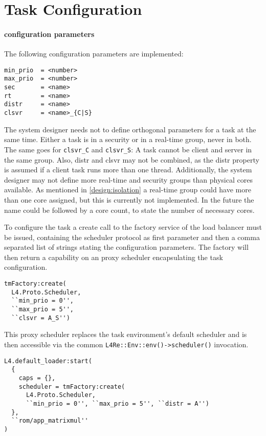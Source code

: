 \section{Task Configuration}
\label{impl:config}

\paragraph{configuration parameters}
The following configuration parameters are implemented:

\begin{lstlisting}[language={[5.2]Lua}]
min_prio  = <number>
max_prio  = <number>
sec       = <name>
rt        = <name>
distr     = <name>
clsvr     = <name>_{C|S}
\end{lstlisting}

The system designer needs not to define orthogonal parameters for
a task at the same time.
Either a task is in a security or in a real-time group, never in both.
The same goes for \texttt{clsvr\_C} and \texttt{clsvr\_S}:
A task cannot be client and server in the same group.
Also, distr and clsvr may not be combined, as the distr property is assumed
if a client task runs more than one thread.
Additionally, the system designer may not define more real-time and security
groups than physical cores available.
As mentioned in \ref{design:isolation} a real-time group could have more than
one core assigned, but this is currently not implemented.
In the future the name could be followed by a core count, to state the number
of necessary cores.

To configure the task a create call to the factory service of the load
balancer must be issued, containing the scheduler protocol as first parameter
and then a comma separated list of strings stating the configuration
parameters.
The factory will then return a capability on an proxy scheduler encapsulating
the task configuration.

\begin{lstlisting}[language={[5.2]Lua}]
tmFactory:create(
  L4.Proto.Scheduler,
  ``min_prio = 0'',
  ``max_prio = 5'',
  ``clsvr = A_S'')
\end{lstlisting}

This proxy scheduler replaces the task environment's default scheduler and is
then accessible via the common \texttt{L4Re::Env::env()->scheduler()} invocation.

\begin{lstlisting}[language={[5.2]Lua}]
L4.default_loader:start(
  {
    caps = {},
    scheduler = tmFactory:create(
      L4.Proto.Scheduler,
      ``min_prio = 0'', ``max_prio = 5'', ``distr = A'')
  },
  ``rom/app_matrixmul''
)
\end{lstlisting}

